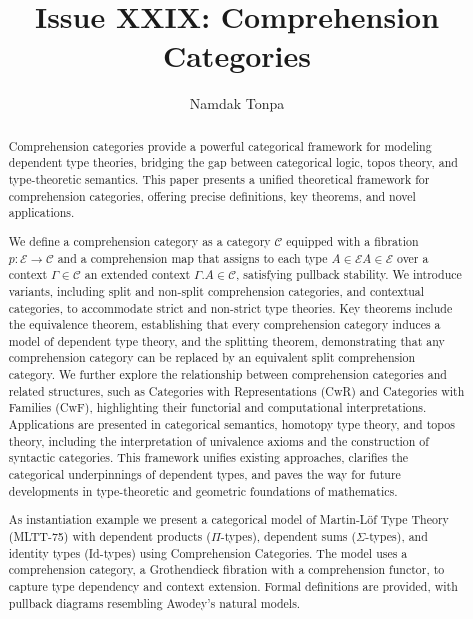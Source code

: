 \documentclass{article}
\begin{document}
\title{Issue XXIX: Comprehension Categories}
\author{Namdak Tonpa}
\date{}


\maketitle

\begin{abstract}
Comprehension categories provide a powerful categorical framework for modeling dependent
type theories, bridging the gap between categorical logic, topos theory, and type-theoretic
semantics. This paper presents a unified theoretical framework for comprehension categories,
offering precise definitions, key theorems, and novel applications.

We define a comprehension
category as a category $\mathcal{C}$
equipped with a fibration $p: \mathcal{E} \to \mathcal{C}$
and a comprehension map that assigns to each type $A \in \mathcal{E}A \in \mathcal{E}$
over a context $\Gamma \in \mathcal{C}$
an extended context $\Gamma.A \in \mathcal{C}$,
satisfying pullback stability. We introduce variants, including split and
non-split comprehension categories, and contextual categories, to accommodate
strict and non-strict type theories. Key theorems include the equivalence theorem,
establishing that every comprehension category induces a model of dependent type theory,
and the splitting theorem, demonstrating that any comprehension category can be replaced
by an equivalent split comprehension category. We further explore the relationship
between comprehension categories and related structures, such as Categories with
Representations (CwR) and Categories with Families (CwF), highlighting their
functorial and computational interpretations. Applications are presented in
categorical semantics, homotopy type theory, and topos theory, including the
interpretation of univalence axioms and the construction of syntactic categories.
This framework unifies existing approaches, clarifies the categorical
underpinnings of dependent types, and paves the way for future developments
in type-theoretic and geometric foundations of mathematics.

As instantiation example we present a categorical model of Martin-Löf Type Theory (MLTT-75)
with dependent products ($\Pi$-types), dependent sums ($\Sigma$-types),
and identity types (Id-types) using Comprehension Categories.
The model uses a comprehension category, a Grothendieck fibration
with a comprehension functor, to capture type dependency and context extension.
Formal definitions are provided, with pullback diagrams resembling Awodey’s natural models.
\end{abstract}
\end{document}
